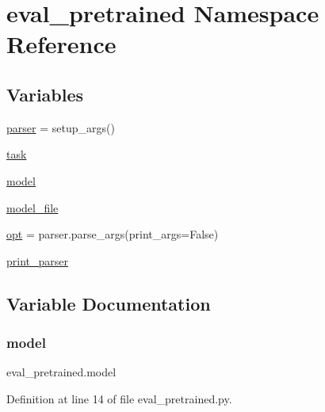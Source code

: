 \hypertarget{namespaceeval__pretrained}{}\section{eval\+\_\+pretrained Namespace Reference}
\label{namespaceeval__pretrained}
\subsection*{Variables}
\begin{DoxyCompactItemize}
\item 
\hyperlink{namespaceeval__pretrained_adf705579068baa81b379b4497dd35de1}{parser} = setup\+\_\+args()
\item 
\hyperlink{namespaceeval__pretrained_a6f09c22ad62cb924ea3f077d66ff37e7}{task}
\item 
\hyperlink{namespaceeval__pretrained_a36921e42ac976dd695e81d99f597e402}{model}
\item 
\hyperlink{namespaceeval__pretrained_a630d14a5c73f1345730ea5fd110ec526}{model\+\_\+file}
\item 
\hyperlink{namespaceeval__pretrained_a975c5ce681931ef679dfbc5e05726c15}{opt} = parser.\+parse\+\_\+args(print\+\_\+args=False)
\item 
\hyperlink{namespaceeval__pretrained_a07a432570d1cd79d1c432b5af6c211ea}{print\+\_\+parser}
\end{DoxyCompactItemize}


\subsection{Variable Documentation}
\mbox{\label{namespaceeval__pretrained_a36921e42ac976dd695e81d99f597e402}} 
\subsubsection{\texorpdfstring{model}{model}}
{\footnotesize\ttfamily eval\+\_\+pretrained.\+model}



Definition at line 14 of file eval\+\_\+pretrained.\+py.

\mbox{\label{namespaceeval__pretrained_a630d14a5c73f1345730ea5fd110ec526}} 
